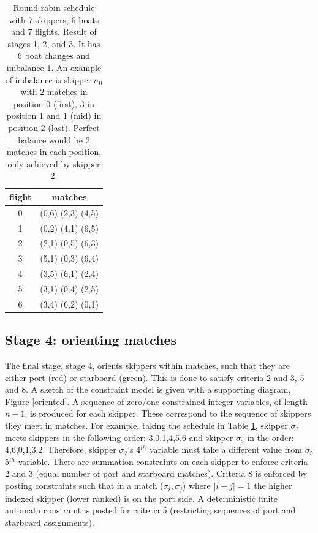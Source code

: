 \documentclass{llncs}
\begin{document}
\begin{table}[h]
\begin{center}
\begin{tabular}{cc} \\ 
flight & matches \\ \hline
0 & (0,6) (2,3) (4,5) \\
1 & (0,2) (4,1) (6,5) \\
2 & (2,1) (0,5) (6,3) \\
3 & (5,1) (0,3) (6,4) \\
4 & (3,5) (6,1) (2,4) \\
5 & (3,1) (0,4) (2,5) \\
6 & (3,4) (6,2) (0,1) \\ \hline
\end{tabular}
\end{center}
\caption{Round-robin schedule with 7 skippers, 6 boats and 7 flights. Result of stages 1, 2, and 3. It has 6 boat changes and imbalance 1. An example of imbalance is skipper $\sigma_{0}$ with 2 matches in position 0 (first), 3 in position 1 and 1 (mid) in position 2 (last). Perfect balance would be 2 matches in each position, only achieved by skipper 2.}
\label{tab2}
\end{table}

\subsection{Stage 4: orienting matches}
The final stage, stage 4, orients skippers within matches, such that they are either port (red) or starboard (green). This is done to satisfy criteria 2 and 3, 5 and 8. A sketch of the constraint model is given with a supporting diagram, Figure \ref{oriented}.  A sequence of zero/one constrained integer variables, of length $n-1$, is produced for each skipper. These correspond to the sequence of skippers they meet in matches. For example, taking the schedule in Table \ref{tab2}, skipper $\sigma_{2}$ meets skippers in the following order: 3,0,1,4,5,6 and skipper $\sigma_{5}$ in the order: 4,6,0,1,3,2. Therefore, skipper $\sigma_{2}$'s 4$^{th}$ variable must take a different value from $\sigma_{5}$ 5$^{th}$ variable. There are summation constraints on each skipper to enforce criteria 2 and 3 (equal number of port and starboard matches). Criteria 8 is enforced by posting constraints such that in a match ($\sigma_{i},\sigma_{j}$) where $|i - j| = 1$ the higher indexed skipper (lower ranked) is on the port side. A deterministic finite automata constraint is posted for criteria 5 (restricting sequences of port and starboard assignments). 
\end{document}
